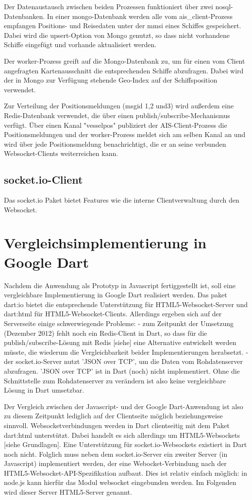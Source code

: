 Der Datenaustausch zwischen beiden Prozessen funktioniert über zwei nosql-Datenbanken. In einer mongo-Datenbank werden alle vom ais\_client-Prozess empfangen Positions- und Reisedaten  unter der mmsi eines Schiffes gespeichert. Dabei wird die upsert-Option von Mongo genutzt, so dass nicht vorhandene Schiffe eingefügt und vorhande aktualisiert werden.

Der worker-Prozess greift auf die Mongo-Datenbank zu, um für einen vom Client angefragten Kartenausschnitt die entsprechenden Schiffe abzufragen. Dabei wird der in Mongo zur Verfügung stehende Geo-Index auf der Schiffsposition verwendet.

Zur Verteilung der Positionsmeldungen (msgid 1,2 und3)  wird außerdem eine Redis-Datenbank verwendet, die über einen publish/subscribe-Mechanismus verfügt. Über einen Kanal "vesselpos" publiziert der AIS-Client-Prozess die Positionsmeldungen und der worker-Prozess meldet sich am selben Kanal an und wird über jede Positionsmeldung benachrichtigt, die er an seine verbunden Websocket-Clients weiterreichen kann.

\subsection{socket.io-Client}
Das socket.io Paket bietet Features wie die interne Clientverwaltung durch den Websocket.

\section{Vergleichsimplementierung in Google Dart}

Nachdem die Anwendung als Prototyp in Javascript fertiggestellt ist, soll eine vergleichbare Implementierung in Google Dart realisiert werden. Das paket dart:io bietet die entsprechende Unterstützung für HTML5-Websocket-Server und dart:html für HTML5-Websocket-Clients.
Allerdings ergeben sich auf der Serverseite einige schwerwiegende Probleme:
- zum Zeitpunkt der Umsetzung (Dezember 2012) fehlt noch ein Redis-Client in Dart, so dass für die publish/subscribe-Lösung mit Redis [siehe] eine Alternative entwickelt werden müsste, die wiederum die Vergleichbarkeit beider Implementierungen herabsetzt.
- der socket.io-Server nutzt 'JSON over TCP', um die Daten vom Rohdatenserver abzufragen. 'JSON over TCP' ist in Dart (noch) nicht implementiert. Ohne die Schnittstelle zum Rohdatenserver zu verändern ist also keine vergleichbare Lösung in Dart umsetzbar.

Der Vergleich zwischen der Javascript- und der Google Dart-Anwendung ist also zu diesem Zeitpunkt lediglich auf der Clientseite möglich beziehungsweise sinnvoll. 
Websocketverbindungen werden in Dart clientseitig mit dem Paket dart:html unterstützt. Dabei handelt es sich allerdings um HTML5-Websockets [siehe Grundlagen]. Eine Unterstützung für socket.io-Websockets existiert in Dart noch nicht.
Folglich muss neben dem socket.io-Server ein zweiter Server (in Javascript) implementiert werden, der eine Webocket-Verbindung nach der HTML5-Websocket-API-Spezifikation aufbaut. Dies ist relativ einfach  möglich: in node.js kann hierfür das Modul websocket eingebunden werden. Im Folgenden wird dieser Server HTML5-Server genannt.

